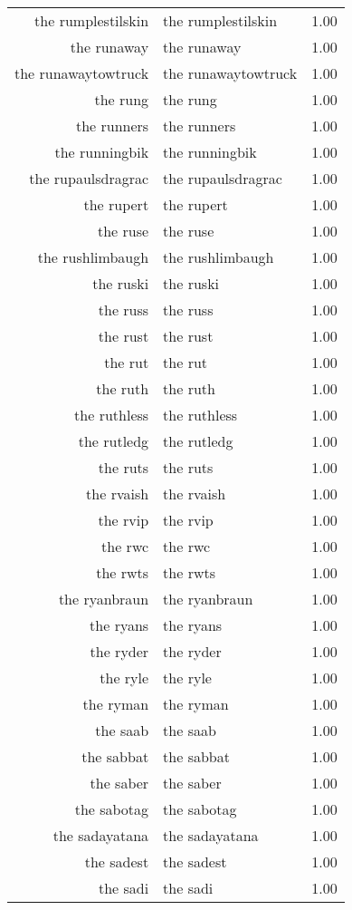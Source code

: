 \begin{table}[ht]
\begin{tabular}{rlr}
  the rumplestilskin & the rumplestilskin & 1.00 \\ 
  the runaway & the runaway & 1.00 \\ 
  the runawaytowtruck & the runawaytowtruck & 1.00 \\ 
  the rung & the rung & 1.00 \\ 
  the runners & the runners & 1.00 \\ 
  the runningbik & the runningbik & 1.00 \\ 
  the rupaulsdragrac & the rupaulsdragrac & 1.00 \\ 
  the rupert & the rupert & 1.00 \\ 
  the ruse & the ruse & 1.00 \\ 
  the rushlimbaugh & the rushlimbaugh & 1.00 \\ 
  the ruski & the ruski & 1.00 \\ 
  the russ & the russ & 1.00 \\ 
  the rust & the rust & 1.00 \\ 
  the rut & the rut & 1.00 \\ 
  the ruth & the ruth & 1.00 \\ 
  the ruthless & the ruthless & 1.00 \\ 
  the rutledg & the rutledg & 1.00 \\ 
  the ruts & the ruts & 1.00 \\ 
  the rvaish & the rvaish & 1.00 \\ 
  the rvip & the rvip & 1.00 \\ 
  the rwc & the rwc & 1.00 \\ 
  the rwts & the rwts & 1.00 \\ 
  the ryanbraun & the ryanbraun & 1.00 \\ 
  the ryans & the ryans & 1.00 \\ 
  the ryder & the ryder & 1.00 \\ 
  the ryle & the ryle & 1.00 \\ 
  the ryman & the ryman & 1.00 \\ 
  the saab & the saab & 1.00 \\ 
  the sabbat & the sabbat & 1.00 \\ 
  the saber & the saber & 1.00 \\ 
  the sabotag & the sabotag & 1.00 \\ 
  the sadayatana & the sadayatana & 1.00 \\ 
  the sadest & the sadest & 1.00 \\ 
  the sadi & the sadi & 1.00 \\ 

\end{tabular}
\end{table}
